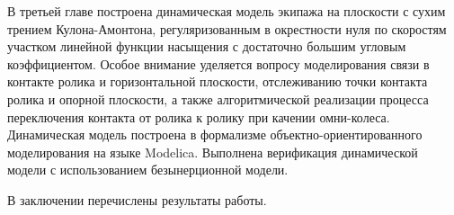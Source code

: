 В третьей главе построена динамическая модель экипажа на плоскости с сухим трением Кулона-Амонтона, регуляризованным в окрестности нуля по скоростям участком линейной функции насыщения с достаточно большим угловым коэффициентом. Особое внимание уделяется вопросу моделирования связи в контакте ролика и горизонтальной плоскости, отслеживанию точки контакта ролика и опорной плоскости, а также алгоритмической реализации процесса переключения контакта от ролика к ролику при качении омни-колеса. Динамическая модель построена в формализме объектно-ориентированного моделирования на языке Modelica. Выполнена верификация динамической модели с использованием безынерционной модели.

В заключении перечислены результаты работы.





